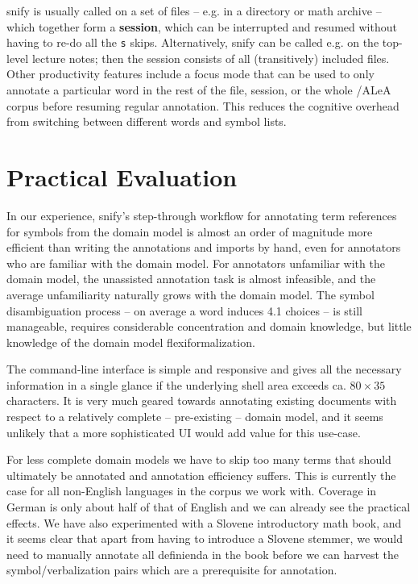 \documentclass{llncs}
\newcommand\ALeA{\textsf{ALeA}\xspace}
\newcommand\snify{\textsf{snify}\xspace}
\begin{document}
\snify is usually called on a set of files -- e.g. in a directory or math archive -- which
together form a \textbf{session}, which can be interrupted and resumed without having to
re-do all the \lstinline|s| skips. Alternatively, \snify can be called e.g. on the top-level
lecture notes; then the session consists of all (transitively) included files. Other productivity
features include a focus mode that can be used to only annotate a particular word in the
rest of the file, session, or the whole \sTeX/\ALeA corpus before resuming regular
annotation. This reduces the cognitive overhead from switching between different 
words and symbol lists.

\section{Practical Evaluation}\label{sec:eval}

In our experience, \snify's step-through workflow for annotating term references for symbols
from the domain model is almost an order of magnitude more efficient than writing the
annotations and imports by hand, even for annotators who are familiar with the domain
model. For annotators unfamiliar with the domain model, the unassisted annotation task is
almost infeasible, and the average unfamiliarity naturally grows with the domain
model. The symbol disambiguation process -- on average a word induces 4.1 choices -- is still manageable,
requires considerable concentration and domain knowledge, but little knowledge of the
domain model flexiformalization.

The command-line interface is simple and responsive and gives all the necessary
information in a single glance if the underlying shell area exceeds ca. $80\times 35$
characters. It is very much geared towards annotating existing documents with respect to a
relatively complete -- pre-existing -- domain model, and it seems unlikely that a more
sophisticated UI would add value for this use-case.

For less complete domain models we have to skip too many terms that should ultimately be
annotated and annotation efficiency suffers. This is currently the case for all
non-English languages in the \sTeX corpus we work with. Coverage in German is only about
half of that of English and we can already see the practical effects. We have also
experimented with a Slovene introductory math book, and it seems clear that apart from
having to introduce a Slovene stemmer, we would need to manually annotate all
definienda in the book before we can harvest the symbol/verbalization pairs which are a
prerequisite for annotation.
\end{document}
